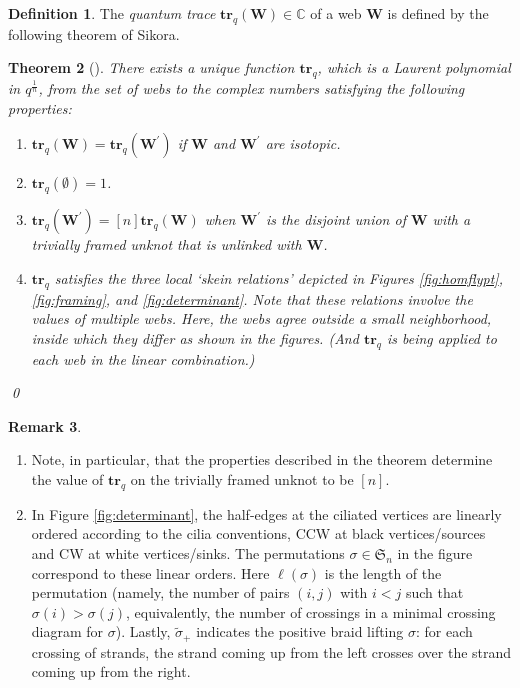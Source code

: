 \documentclass[12pt, reqno]{amsart}
\newtheorem{theo}{Theorem}[section]
\theoremstyle{definition}
\newtheorem{defi}[theo]{Definition}
\newtheorem{rema}[theo]{Remark}
\renewcommand{\tilde}{\widetilde}
\newcommand{\trq}{\mathbf{tr}_q}%
\begin{document}
\begin{defi}
The \emph{quantum trace} $\trq(\mathbf{W})\in\mathbb{C}$ of a web $\mathbf{W}$ is defined by the following theorem of Sikora.
\end{defi}

\begin{theo}[{\cite{sikora1}}]\label{theo:qtraceofweb}
There exists a unique function $\trq$, which is a Laurent polynomial in $q^\frac{1}{n}$, from the set of webs to the complex numbers satisfying the following properties:
\begin{enumerate}
\item
$\trq(\mathbf{W})=\trq(\mathbf{W}^\prime)$ if $\mathbf{W}$ and $\mathbf{W}^\prime$ are isotopic.
\item
$\trq(\emptyset)=1$.
\item
$\trq(\mathbf{W}^\prime)=[n]\trq(\mathbf{W})$ when $\mathbf{W}^\prime$ is the disjoint union of $\mathbf{W}$ with a trivially framed unknot that is unlinked with $\mathbf{W}$.    
\item
$\trq$ satisfies the three local `skein relations' depicted in Figures \ref{fig:homflypt}, \ref{fig:framing}, and \ref{fig:determinant}.  Note that these relations involve the values of multiple webs.  Here, the webs agree outside a small neighborhood, inside which they differ as shown in the figures.  (And $\trq$ is being applied to each web in the linear combination.)
\end{enumerate}
\qed\end{theo}

\begin{rema}
\begin{enumerate}
\item
Note, in particular, that the properties described in the theorem determine the value of $\trq$ on the trivially framed unknot to be $[n]$. 
\item
In Figure \ref{fig:determinant}, the half-edges at the ciliated vertices are linearly ordered according to the cilia conventions, CCW at black vertices/sources and CW at white vertices/sinks. The permutations $\sigma\in \mathfrak{S}_n$ in the figure correspond to these linear orders.  Here $\ell(\sigma)$ is the length of the permutation (namely, the number of pairs $(i,j)$ with $i<j$ such that $\sigma(i)>\sigma(j)$, equivalently, the number of crossings in a minimal crossing diagram for $\sigma$).  Lastly, $\tilde{\sigma}_+$ indicates the positive braid lifting $\sigma$: for each crossing of strands, the strand coming up from the left crosses over the strand coming up from the right. 
\end{enumerate}
\end{rema}
\end{document}
